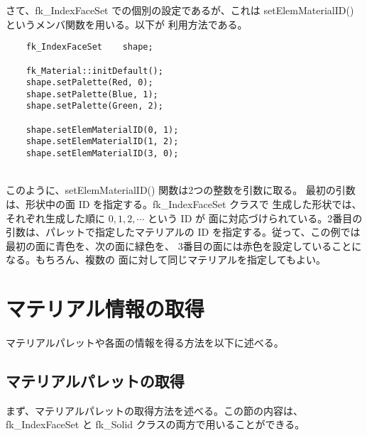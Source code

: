 さて、fk\_IndexFaceSet での個別の設定であるが、これは
setElemMaterialID() というメンバ関数を用いる。以下が
利用方法である。
\\
\begin{breakbox}
\begin{verbatim}
    fk_IndexFaceSet    shape;

    fk_Material::initDefault();
    shape.setPalette(Red, 0);
    shape.setPalette(Blue, 1);
    shape.setPalette(Green, 2);

    shape.setElemMaterialID(0, 1);
    shape.setElemMaterialID(1, 2);
    shape.setElemMaterialID(3, 0);
\end{verbatim}
\end{breakbox}
~ \\
このように、setElemMaterialID() 関数は2つの整数を引数に取る。
最初の引数は、形状中の面 ID を指定する。fk\_IndexFaceSet クラスで
生成した形状では、それぞれ生成した順に \(0, 1, 2, \cdots\) という ID が
面に対応づけられている。2番目の引数は、パレットで指定したマテリアルの
ID を指定する。従って、この例では最初の面に青色を、次の面に緑色を、
3番目の面には赤色を設定していることになる。もちろん、複数の
面に対して同じマテリアルを指定してもよい。
\newpage
\section{マテリアル情報の取得}
マテリアルパレットや各面の情報を得る方法を以下に述べる。
\subsection{マテリアルパレットの取得}
まず、マテリアルパレットの取得方法を述べる。この節の内容は、
fk\_IndexFaceSet と fk\_Solid クラスの両方で用いることができる。

